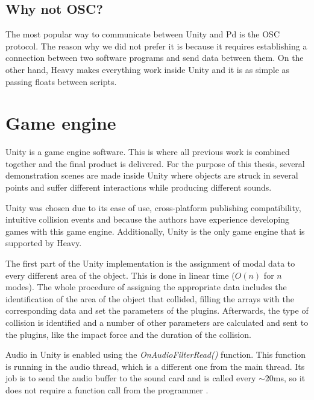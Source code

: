 \subsection{Why not OSC?}
The most popular way to communicate between Unity\textsuperscript{\textregistered} and \gls{Pd} is the \gls{OSC} protocol. The reason why we did not prefer it is because it requires establishing a connection between two software programs and send data between them. On the other hand, Heavy makes everything work inside Unity\textsuperscript{\textregistered} and it is as simple as passing floats between scripts. 

\section{Game engine}
Unity\textsuperscript{\textregistered} is a game engine software. This is where all previous work is combined together and the final product is delivered. For the purpose of this thesis, several demonstration scenes are made inside Unity\textsuperscript{\textregistered} where objects are struck in several points and suffer different interactions while producing different sounds. 

Unity\textsuperscript{\textregistered} was chosen due to its ease of use, cross-platform publishing compatibility, intuitive collision events and because the authors have experience developing games with this game engine. Additionally, Unity\textsuperscript{\textregistered} is the only game engine that is supported by Heavy.

The first part of the Unity\textsuperscript{\textregistered} implementation is the assignment of modal data to every different area of the object. This is done in linear time ($O(n)$ for $n$ modes). The whole procedure of assigning the appropriate data includes the identification of the area of the object that collided, filling the arrays with the corresponding data and set the parameters of the plugins. Afterwards, the type of collision is identified and a number of other parameters are calculated and sent to the plugins, like the impact force and the duration of the collision.

Audio in Unity\textsuperscript{\textregistered} is enabled using the \textit{OnAudioFilterRead()} function. This function is running in the audio thread, which is a different one from the main thread. Its job is to send the audio buffer to the sound card and is called every $\sim 20$ms, so it does not require a function call from the programmer \cite{bib:unity_doc}.

